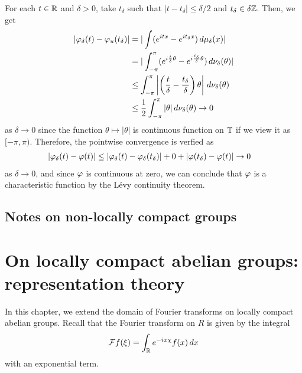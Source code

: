 \documentclass[a4paper]{article}
\begin{document}
\begin{pf}
For each $t\in\mathbb{R}$ and $\delta>0$, take $t_\delta$ such that $|t-t_\delta|\le\delta/2$ and $t_\delta\in\delta\mathbb{Z}$.
Then, we get
\begin{align*}
|\varphi_\delta(t)-\varphi_u(t_\delta)|
&=|\int(e^{itx}-e^{it_\delta x})\,d\mu_\delta(x)|\\
&=|\int_{-\pi}^\pi(e^{i\frac t\delta\theta}-e^{i\frac{t_\delta}\delta\theta})\,d\nu_\delta(\theta)|\\
&\le\int_{-\pi}^\pi\left|\left(\frac t\delta-\frac{t_\delta}\delta\right)\theta\right|\,d\nu_\delta(\theta)\\
&\le\frac12\int_{-\pi}^\pi|\theta|\,d\nu_\delta(\theta)\to0
\end{align*}
as $\delta\to0$ since the function $\theta\mapsto|\theta|$ is continuous function on $\mathbb{T}$ if we view it as $[-\pi,\pi)$.
Therefore, the pointwise convergence is verfied as
\begin{align*}
|\varphi_\delta(t)-\varphi(t)|&\le|\varphi_\delta(t)-\varphi_\delta(t_\delta)|+0+|\varphi(t_\delta)-\varphi(t)|\to0
\end{align*}
as $\delta\to0$, and since $\varphi$ is continuous at zero, we can conclude that $\varphi$ is a characteristic function by the L\'evy continuity theorem.
\end{pf}



\subsection{Notes on non-locally compact groups}
\iffalse
bochner
measure <=> pos def continuous

schwarts bochner (finite condition removed)
tempered measure <=> pos def tempered dist


on hilbert space
measure <=> pos def continuous + trace class
\fi









\newpage
\section{On locally compact abelian groups: representation theory}

In this chapter, we extend the domain of Fourier transforms on locally compact abelian groups.
Recall that the Fourier transform on $R$ is given by the integral
\[\mathcal{F} f(\xi)=\int_{\mathbb{R}} e^{-ix\chi}f(x)\,dx\]
with an exponential term.
\end{document}
